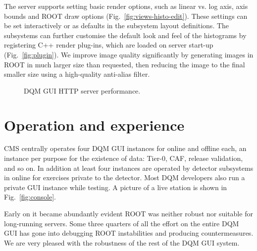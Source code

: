 \documentclass[a4paper]{jpconf}
\begin{document}
The server supports setting basic render options, such as linear
vs. log axis, axis bounds and ROOT draw options
(Fig.~\ref{fig:views-histo-edit}).  These settings can be set
interactively or as defaults in the subsystem layout definitions.  The
subsystems can further customise the default look and feel of the
histograms by registering C++ render plug-ins, which are loaded on
server start-up (Fig.~\ref{fig:plugin}).  We improve image quality
significantly by generating images in ROOT in much larger size than
requested, then reducing the image to the final smaller size using a
high-quality anti-alias filter.


\begin{figure}[!b]
\begin{center}
\hfill
{}\hfill
\caption{\label{fig:performance}DQM GUI HTTP server performance.}
\end{center}
\end{figure}

\section{Operation and experience}

CMS centrally operates four DQM GUI instances for online and offline
each, an instance per purpose for the existence of data: Tier-0, CAF,
release validation, and so on.  In addition at least four instances
are operated by detector subsystems in online for exercises private to
the detector.  Most DQM developers also run a private GUI instance
while testing.  A picture of a live station is shown in
Fig.~\ref{fig:console}.

Early on it became abundantly evident ROOT was neither robust nor
suitable for long-running servers.  Some three quarters of all the
effort on the entire DQM GUI has gone into debugging ROOT
instabilities and producing countermeasures.  We are very pleased with
the robustness of the rest of the DQM GUI system.
\end{document}
